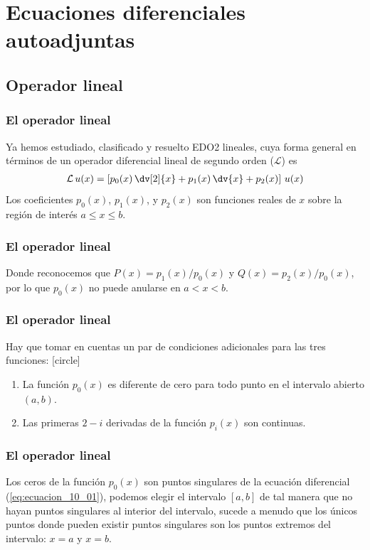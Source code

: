 \section{Ecuaciones diferenciales autoadjuntas}
\subsection{Operador lineal}
\begin{frame}
\frametitle{El operador lineal}
Ya hemos estudiado, clasificado y resuelto EDO2 lineales, cuya forma general en términos de un operador diferencial lineal de segundo orden ($\mathcal{L}$) es
{\fontsize{12}{12}\selectfont
\begin{align}
\mathcal{L} \, u(x) = \left[ p_{0}(x) \, \dv[2]{x} + p_{1}(x) \, \dv{x} + p_{2}(x) \right] \, u(x)
\label{eq:ecuacion_10_01}
\end{align}}
Los coeficientes $p_{0} (x)$, $p_{1} (x)$, y $p_{2} (x)$ son funciones reales de $x$ sobre la región de interés $a \leq x \leq b$.
\end{frame}
\begin{frame}
\frametitle{El operador lineal}
Donde reconocemos que $P(x) = p_{1}(x)/p_{0}(x)$ y $Q(x)= p_{2}(x)/p_{0}(x)$, por lo que $p_{0}(x)$ no puede anularse en $a < x < b$.
\end{frame}
\begin{frame}
\frametitle{El operador lineal}
Hay que tomar en cuentas un par de condiciones adicionales para las tres funciones:
[circle]
\begin{enumerate}[<+->]
\item La función $p_{0}(x)$ es diferente de cero para todo punto en el intervalo abierto $(a, b)$.
\item Las primeras $2-i$ derivadas de la función $p_{i}(x)$ son continuas.
\end{enumerate}
\end{frame}
\begin{frame}
\frametitle{El operador lineal}
Los ceros de la función $p_{0}(x)$ son puntos singulares de la ecuación diferencial (\ref{eq:ecuacion_10_01}), podemos elegir el intervalo $[a, b]$ de tal manera que no hayan puntos singulares al interior del intervalo, sucede a menudo que los únicos puntos donde pueden existir puntos singulares son los puntos extremos del intervalo: $x = a$ y $x = b$.
\end{frame}
